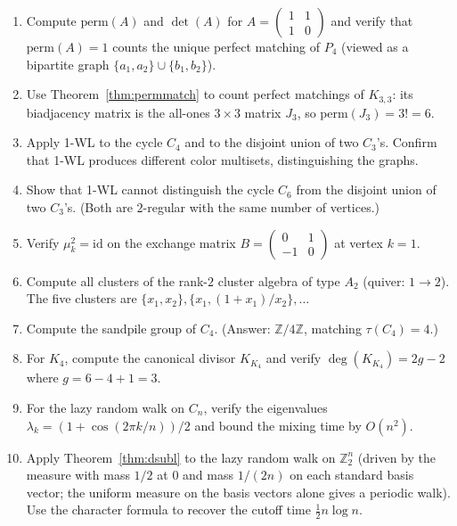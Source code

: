 \begin{enumerate}
\item Compute $\mathrm{perm}(A)$ and $\det(A)$ for
$A = \begin{pmatrix} 1 & 1 \\ 1 & 0 \end{pmatrix}$ and verify that
$\mathrm{perm}(A) = 1$ counts the unique perfect matching of $P_4$
(viewed as a bipartite graph $\{a_1, a_2\} \cup \{b_1, b_2\}$).

\item Use Theorem~\ref{thm:permmatch} to count perfect matchings of $K_{3,3}$:
its biadjacency matrix is the all-ones $3 \times 3$ matrix $J_3$, so
$\mathrm{perm}(J_3) = 3! = 6$.

\item Apply 1-WL to the cycle $C_4$ and to the disjoint union of two $C_3$'s.
Confirm that 1-WL produces different color multisets, distinguishing
the graphs.

\item Show that 1-WL cannot distinguish the cycle $C_6$ from the disjoint
union of two $C_3$'s. (Both are $2$-regular with the same number of
vertices.)

\item Verify $\mu_k^2 = \mathrm{id}$ on the exchange matrix
$B = \begin{pmatrix} 0 & 1 \\ -1 & 0 \end{pmatrix}$ at vertex $k = 1$.

\item Compute all clusters of the rank-$2$ cluster algebra of type $A_2$
(quiver: $1 \to 2$). The five clusters are $\{x_1, x_2\}, \{x_1, (1+x_1)/x_2\}, \ldots$

\item Compute the sandpile group of $C_4$. (Answer: $\mathbb Z / 4 \mathbb Z$,
matching $\tau(C_4) = 4$.)

\item For $K_4$, compute the canonical divisor $K_{K_4}$ and verify
$\deg(K_{K_4}) = 2g - 2$ where $g = 6 - 4 + 1 = 3$.

\item For the lazy random walk on $C_n$, verify the eigenvalues $\lambda_k = (1 + \cos(2\pi k / n))/2$
and bound the mixing time by $O(n^2)$.

\item Apply Theorem~\ref{thm:dsubl} to the lazy random walk on $\mathbb Z_2^n$
(driven by the measure with mass $1/2$ at $0$ and mass $1/(2n)$ on each
standard basis vector; the uniform measure on the basis vectors alone
gives a periodic walk). Use the
character formula to recover the cutoff time $\tfrac{1}{2} n \log n$.


\end{enumerate}
